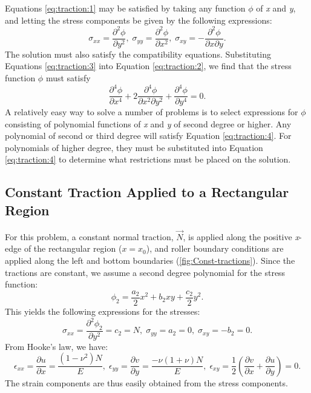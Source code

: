 Equations \vref{eq:traction:1} may be satisfied by taking any function $\phi$
of \textit{x} and \textit{y}, and letting the stress components be
given by the following expressions:
\begin{equation}
\sigma_{xx}=\frac{\partial^{2}\phi}{\partial y^{2}},\;\sigma_{yy}=\frac{\partial^{2}\phi}{\partial x^{2}},\;\sigma_{xy}=-\frac{\partial^{2}\phi}{\partial x\partial y}.\label{eq:traction:3}
\end{equation}
The solution must also satisfy the compatibility equations. Substituting
Equations \vref{eq:traction:3} into Equation \vref{eq:traction:2}, we find that the
stress function $\phi$ must satisfy
\begin{equation}
\frac{\partial^{4}\phi}{\partial x^{4}}+2\frac{\partial^{4}\phi}{\partial x^{2}\partial y^{2}}+\frac{\partial^{4}\phi}{\partial y^{4}}=0.\label{eq:traction:4}
\end{equation}
A relatively easy way to solve a number of problems is to select expressions
for $\phi$ consisting of polynomial functions of \textit{x} and \textit{y}
of second degree or higher. Any polynomial of second or third degree
will satisfy Equation \vref{eq:traction:4}. For polynomials of higher degree,
they must be substituted into Equation \vref{eq:traction:4} to determine what
restrictions must be placed on the solution.


\subsection{\label{sub:Analytical-Constant-Traction}Constant Traction Applied
to a Rectangular Region}

For this problem, a constant normal traction, $\overrightarrow{N}$,
is applied along the positive \textit{x}-edge of the rectangular region
($x=x_{0}$), and roller boundary conditions are applied along the
left and bottom boundaries (\vref{fig:Const-tractions}). Since the
tractions are constant, we assume a second degree polynomial for the
stress function:
\begin{equation}
\phi_{2}=\frac{a_{2}}{2}x^{2}+b_{2}xy+\frac{c_{2}}{2}y^{2}.\label{eq:traction:5}
\end{equation}
This yields the following expressions for the stresses:
\begin{equation}
\sigma_{xx}=\frac{\partial^{2}\phi_{2}}{\partial y^{2}}=c_{2}=N,\;\sigma_{yy}=a_{2}=0,\;\sigma_{xy}=-b_{2}=0.\label{eq:traction:6}
\end{equation}
From Hooke's law, we have:
\begin{equation}
\epsilon_{xx}=\frac{\partial u}{\partial x}=\frac{\left(1-\nu^{2}\right)N}{E},\;\epsilon_{yy}=\frac{\partial v}{\partial y}=\frac{-\nu\left(1+\nu\right)N}{E},\;\epsilon_{xy}=\frac{1}{2}\left(\frac{\partial v}{\partial x}+\frac{\partial u}{\partial y}\right)=0.\label{eq:traction:7}
\end{equation}
The strain components are thus easily obtained from the stress components.


